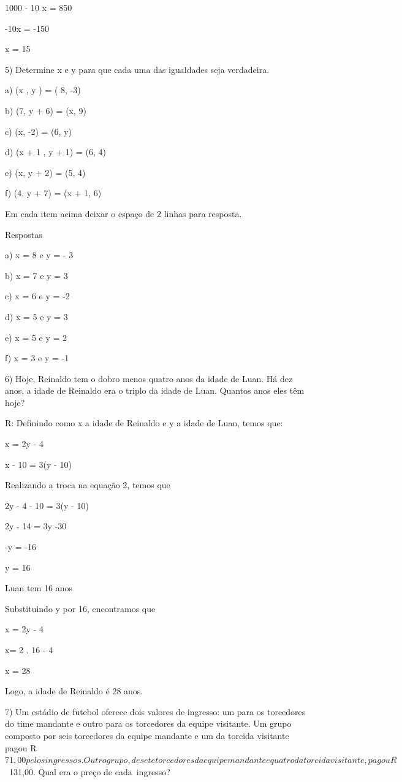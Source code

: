 1000 - 10 x = 850

-10x = -150

x = 15

5) Determine x e y para que cada uma das igualdades seja verdadeira.

a) (x , y ) = ( 8, -3)

b) (7, y + 6) = (x, 9)

c) (x, -2) = (6, y)

d) (x + 1 , y + 1) = (6, 4)

e) (x, y + 2) = (5, 4)

f) (4, y + 7) = (x + 1, 6)

Em cada item acima deixar o espaço de 2 linhas para resposta.

Respostas

a) x = 8 e y = - 3

b) x = 7 e y = 3

c) x = 6 e y = -2

d) x = 5 e y = 3

e) x = 5 e y = 2

f) x = 3 e y = -1

6) Hoje, Reinaldo tem o dobro menos quatro anos da idade de Luan. Há dez
anos, a idade de Reinaldo era o triplo da idade de Luan. Quantos anos
eles têm hoje?

R: Definindo como x a idade de Reinaldo e y a idade de Luan, temos que:

x = 2y - 4

x - 10 = 3(y - 10)

Realizando a troca na equação 2, temos que

2y - 4 - 10 = 3(y - 10)

2y - 14 = 3y -30

-y = -16

y = 16

Luan tem 16 anos

Substituindo y por 16, encontramos que

x = 2y - 4

x= 2 . 16 - 4

x = 28

Logo, a idade de Reinaldo é 28 anos.

7) Um estádio de futebol oferece dois valores de ingresso: um para os
torcedores do time mandante e outro para os torcedores da equipe
visitante. Um grupo composto por seis torcedores da equipe mandante e um
da torcida visitante pagou
R\(71,00 pelos ingressos. Outro grupo, de sete torcedores da equipe mandante e quatro da torcida visitante, pagou R\)~131,00.
Qual era o preço de cada~ingresso?

